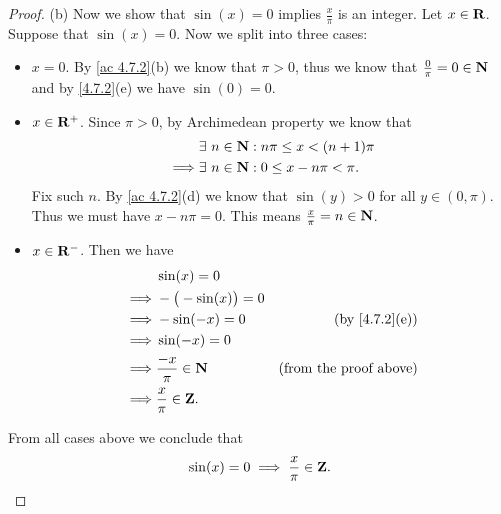 \begin{proof}{(b)}
  Now we show that \(\sin(x) = 0\) implies \(\frac{x}{\pi}\) is an integer.
  Let \(x \in \mathbf{R}\).
  Suppose that \(\sin(x) = 0\).
  Now we split into three cases:
  \begin{itemize}
    \item \(x = 0\).
          By \cref{ac 4.7.2}(b) we know that \(\pi > 0\), thus we know that \(\frac{0}{\pi} = 0 \in \mathbf{N}\) and by \cref{4.7.2}(e) we have \(\sin(0) = 0\).
    \item \(x \in \mathbf{R}^+\).
          Since \(\pi > 0\), by Archimedean property we know that
          \begin{align*}
                     & \exists\ n \in \mathbf{N} : n \pi \leq x < (n + 1) \pi \\
            \implies & \exists\ n \in \mathbf{N} : 0 \leq x - n \pi < \pi.
          \end{align*}
          Fix such \(n\).
          By \cref{ac 4.7.2}(d) we know that \(\sin(y) > 0\) for all \(y \in (0, \pi)\).
          Thus we must have \(x - n \pi = 0\).
          This means \(\frac{x}{\pi} = n \in \mathbf{N}\).
    \item \(x \in \mathbf{R}^-\).
          Then we have
          \begin{align*}
                     & \sin(x) = 0                                             \\
            \implies & -\big(-\sin(x)\big) = 0                                 \\
            \implies & -\sin(-x) = 0           & \text{(by \cref{4.7.2}(e))}   \\
            \implies & \sin(-x) = 0                                            \\
            \implies & \frac{-x}{\pi} \in \N   & \text{(from the proof above)} \\
            \implies & \frac{x}{\pi} \in \Z.
          \end{align*}
  \end{itemize}
  From all cases above we conclude that
  \[
    \sin(x) = 0 \implies \frac{x}{\pi} \in \mathbf{Z}.
  \]
\end{proof}

